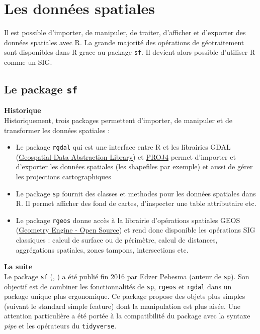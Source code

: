 \documentclass[]{book}
\providecommand{\tightlist}{%
  \setlength{\itemsep}{0pt}\setlength{\parskip}{0pt}}
\begin{document}
\hypertarget{chapitre1}{\chapter{Les données
spatiales}\label{chapitre1}}

Il est possible d'importer, de manipuler, de traiter, d'afficher et
d'exporter des données spatiales avec R. La grande majorité des
opérations de géotraitement sont disponibles dans R grace au package
\texttt{sf}. Il devient alors possible d'utiliser R comme un SIG.

\section{\texorpdfstring{Le package
\texttt{sf}}{Le package sf}}\label{le-package-sf}

\textbf{Historique}\\
Historiquement, trois packages permettent d'importer, de manipuler et de
transformer les données spatiales :

\begin{itemize}
\tightlist
\item
  Le package \texttt{rgdal} qui est une interface entre R et les
  librairies GDAL (\href{http://www.gdal.org/}{Geospatial Data
  Abstraction Library}) et \href{https://github.com/OSGeo/proj.4}{PROJ4}
  permet d'importer et d'exporter les données spatiales (les shapefiles
  par exemple) et aussi de gérer les projections cartographiques\\
\item
  Le package \texttt{sp} fournit des classes et methodes pour les
  données spatiales dans R. Il permet afficher des fond de cartes,
  d'inspecter une table attributaire etc.\\
\item
  Le package \texttt{rgeos} donne accès à la librairie d'opérations
  spatiales GEOS (\href{http://trac.osgeo.org/geos/}{Geometry Engine -
  Open Source}) et rend donc disponible les opérations SIG classiques :
  calcul de surface ou de périmètre, calcul de distances, aggrégations
  spatiales, zones tampons, intersections etc.
\end{itemize}

\textbf{La suite}\\
Le package \texttt{sf} (\citep{R-sf}, \citep{Pebesma18}) a été publié
fin 2016 par Edzer Pebesma (auteur de \texttt{sp}). Son objectif est de
combiner les fonctionnalités de \texttt{sp}, \texttt{rgeos} et
\texttt{rgdal} dans un package unique plus ergonomique. Ce package
propose des objets plus simples (suivant le standard simple feature)
dont la manipulation est plus aisée. Une attention particulière a été
portée à la compatibilité du package avec la syntaxe \emph{pipe} et les
opérateurs du \texttt{tidyverse}.
\end{document}
